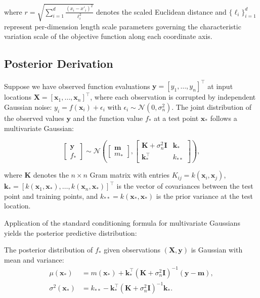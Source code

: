 where $r = \sqrt{\sum_{i=1}^{d} \frac{(x_i - x'_i)^2}{\ell_i^2}}$ denotes the scaled Euclidean distance and $\{\ell_i\}_{i=1}^{d}$ represent per-dimension length scale parameters governing the characteristic variation scale of the objective function along each coordinate axis.

\subsection{Posterior Derivation}

Suppose we have observed function evaluations $\mathbf{y} = [y_1, \ldots, y_n]^\top$ at input locations $\mathbf{X} = [\mathbf{x}_1, \ldots, \mathbf{x}_n]^\top$, where each observation is corrupted by independent Gaussian noise: $y_i = f(\mathbf{x}_i) + \epsilon_i$ with $\epsilon_i \sim \mathcal{N}(0, \sigma_n^2)$. The joint distribution of the observed values $\mathbf{y}$ and the function value $f_*$ at a test point $\mathbf{x}_*$ follows a multivariate Gaussian:

\begin{equation}
\begin{bmatrix} \mathbf{y} \\ f_* \end{bmatrix} \sim \mathcal{N}\left(
\begin{bmatrix} \mathbf{m} \\ m_* \end{bmatrix},
\begin{bmatrix} \mathbf{K} + \sigma_n^2 \mathbf{I} & \mathbf{k}_* \\ \mathbf{k}_*^\top & k_{**} \end{bmatrix}
\right),
\end{equation}

where $\mathbf{K}$ denotes the $n \times n$ Gram matrix with entries $K_{ij} = k(\mathbf{x}_i, \mathbf{x}_j)$, $\mathbf{k}_* = [k(\mathbf{x}_1, \mathbf{x}_*), \ldots, k(\mathbf{x}_n, \mathbf{x}_*)]^\top$ is the vector of covariances between the test point and training points, and $k_{**} = k(\mathbf{x}_*, \mathbf{x}_*)$ is the prior variance at the test location.

Application of the standard conditioning formula for multivariate Gaussians yields the posterior predictive distribution:

\begin{theorem}
\label{thm:gp_posterior}
The posterior distribution of $f_*$ given observations $(\mathbf{X}, \mathbf{y})$ is Gaussian with mean and variance:
\begin{align}
\mu(\mathbf{x}_*) &= m(\mathbf{x}_*) + \mathbf{k}_*^\top \left(\mathbf{K} + \sigma_n^2 \mathbf{I}\right)^{-1} (\mathbf{y} - \mathbf{m}), \label{eq:gp_mean} \\
\sigma^2(\mathbf{x}_*) &= k_{**} - \mathbf{k}_*^\top \left(\mathbf{K} + \sigma_n^2 \mathbf{I}\right)^{-1} \mathbf{k}_*. \label{eq:gp_variance}
\end{align}
\end{theorem}

